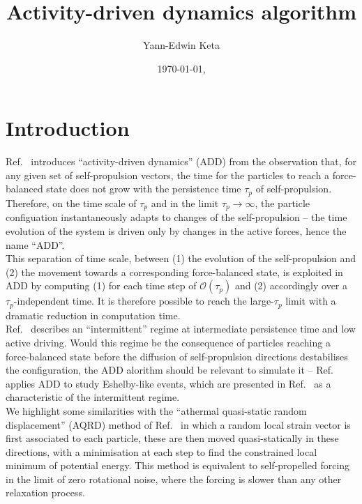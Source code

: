 \documentclass[pre,aps,superscriptaddress,longbibliography,notitlepage]{revtex4-1}
\begin{document}
\title{Activity-driven dynamics algorithm}
\author{Yann-Edwin Keta}
\date{\today, \currenttime}
\maketitle
\tableofcontents

\section{Introduction}

Ref.~\cite{mandal2020study} introduces ``activity-driven dynamics'' (ADD) from the observation that, for any given set of self-propulsion vectors, the time for the particles to reach a force-balanced state does not grow with the persistence time $\tau_p$ of self-propulsion. Therefore, on the time scale of $\tau_p$ and in the limit $\tau_p \to \infty$, the particle configuation instantaneously adapts to changes of the self-propulsion -- the time evolution of the system is driven only by changes in the active forces, hence the name ``ADD''.\\

This separation of time scale, between (1) the evolution of the self-propulsion and (2) the movement towards a corresponding force-balanced state, is exploited in ADD by computing (1) for each time step of $\mathcal{O}(\tau_p)$ and (2) accordingly over a $\tau_p$-independent time. It is therefore possible to reach the large-$\tau_p$ limit with a dramatic reduction in computation time.\\

Ref.~\cite{mandal2020extreme} describes an ``intermittent'' regime at intermediate persistence time and low active driving. Would this regime be the consequence of particles reaching a force-balanced state before the diffusion of self-propulsion directions destabilises the configuration, the ADD alorithm should be relevant to simulate it -- Ref.~\cite{mandal2020study} applies ADD to study Eshelby-like events, which are presented in Ref.~\cite{mandal2020extreme} as a characteristic of the intermittent regime.\\

We highlight some similarities with the ``athermal quasi-static random displacement'' (AQRD) method of Ref.~\cite{morse2020direct} in which a random local strain vector is first associated to each particle, these are then moved quasi-statically in these directions, with a minimisation at each step to find the constrained local minimum of potential energy. This method is equivalent to self-propelled forcing in the limit of zero rotational noise, where the forcing is slower than any other relaxation process.
\end{document}
